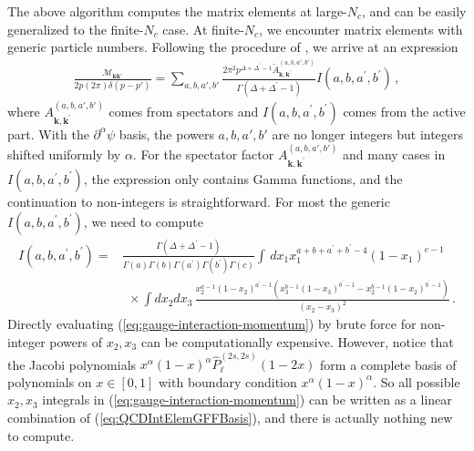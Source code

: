 \documentclass[12pt]{article}
\renewcommand{\d}{\partial}
\newcommand{\Mcal}{{\mathcal M}}
\newcommand{\kvec}{\boldsymbol{k}}
\newcommand{\Kvec}{\boldsymbol{k}}
\newcommand{\Nc}{N_c}
\begin{document}
    The above algorithm computes the matrix elements at large-$\Nc$, and can be easily generalized to the finite-$\Nc$ case. At finite-$\Nc$, we encounter matrix elements with generic particle numbers. Following the procedure of \cite{Anand:2020gnn}, we arrive at an expression
    \begin{equation}
    \begin{aligned}
        \frac{\Mcal_{\Kvec \Kvec'}}{2p(2\pi)\delta(p-p')} = \sum_{a,b,a',b'}  \frac{
            2\pi^2 
            p^{\Delta+\Delta^\prime-1}
            \tilde A_{\kvec,\kvec^\prime}^{(a,b,a',b')}
        }{\Gamma(\Delta+\Delta^\prime-1)} I(a,b,a^\prime,b^\prime) \, ,
        \label{eq:gaugesummaryeqFirst}
    \end{aligned}
    \end{equation}
    where $A_{\kvec,\kvec^\prime}^{(a,b,a',b')}$ comes from spectators and $I(a,b,a^\prime,b^\prime)$ comes from the active part. With the $\d^\alpha\psi$ basis, the powers $a,b,a',b'$ are no longer integers but integers shifted uniformly by $\alpha$. For the spectator factor $A_{\kvec,\kvec^\prime}^{(a,b,a',b')}$ and many cases in $I(a,b,a^\prime,b^\prime)$, the expression only contains Gamma functions, and the continuation to non-integers is straightforward. For most the generic $I(a,b,a^\prime,b^\prime)$, we need to compute 
    \begin{equation}
    \begin{aligned}\label{eq:gauge-interaction-momentum}
    I(a,b,a^\prime,b^\prime) =& \frac{
    \Gamma(\Delta+\Delta^\prime-1)
    }
    {
    \Gamma(a)\Gamma(b)\Gamma(a^\prime)\Gamma(b^\prime)
    \Gamma(c)}
    \int \, dx_1 x_1^{a+b+a^\prime+b^\prime-4}(1-x_1)^{c-1}  \\
    &~~\times 
    \int dx_2 dx_3 \, 
    \frac{x_2^{a-1} (1-x_2)^{a^\prime-1} \left( x_3^{b-1} (1-x_3)^{b^\prime-1} - x_2^{b-1} (1-x_2)^{b^\prime-1}\right) }{(x_2-x_3)^2} \, .
    \end{aligned}
    \end{equation}
Directly evaluating   (\ref{eq:gauge-interaction-momentum}) by brute force for non-integer powers of $x_2, x_3$ can be computationally expensive.
 However, notice that the Jacobi polynomials $x^{\alpha}(1-x)^{\alpha}
    \widehat{P}_{\ell}^{(2s,2s)}(1-2x)$ form a complete basis of polynomials on $x\in[0,1]$ with boundary condition $x^{\alpha}(1-x)^{\alpha}$. 
    So all possible $x_2,x_3$ integrals in (\ref{eq:gauge-interaction-momentum}) can be written as a linear combination of (\ref{eq:QCDIntElemGFFBasis}), and there is actually nothing new to compute.
\end{document}
